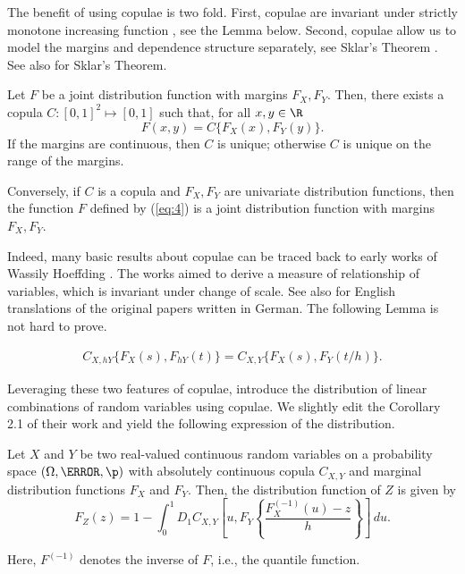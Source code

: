 The benefit of using copulae is two fold.
First, copulae are invariant under strictly
monotone increasing function \citep{schweizer1981nonparametric}, see the Lemma below.
Second, copulae allow us to model the  margins and dependence structure separately, see Sklar's Theorem
\citep{Sklar1959}.
See also \citep{Nelsen1999, joe1997multivariate, McNeil2005} for Sklar's Theorem. \medskip

\begin{theorem}
  Let $F$ be a joint distribution function with margins $F_X,
  F_Y$. Then, there exists a copula $C:[0,1]^2 \mapsto [0,1]$ such
  that, for all $x,y\in \R$
  \begin{equation}
    \label{eq:4}
    F(x,y)=C\{F_X(x), F_Y(y)\}.
  \end{equation}
  If the margins are continuous, then $C$ is unique; otherwise $C$ is
  unique on the range of the margins.

  Conversely, if $C$ is a copula and $F_X, F_Y$ are univariate
  distribution functions, then the function $F$ defined by (\ref{eq:4})
  is a joint distribution function with margins $F_X, F_Y$.
\end{theorem}

Indeed, many basic results about copulae can be traced back to early
works of Wassily Hoeffding \citep{hoedffding1940, hoedffding1941}. 
The works aimed to derive a measure of relationship of variables,
which is invariant under change of scale. 
See also \citet{hoeffding2012collected} for English translations of
the original papers written in German. 
The following Lemma is not hard to prove. 

\begin{lemma}
  \begin{align}
  C_{X, hY}\{F_X(s),F_{hY}(t)\} = C_{X, Y}\{F_X(s),F_{Y}(t/h)\}.
    \end{align}
  \end{lemma}


Leveraging these two features of copulae, \citet{barbi2014copula}
introduce the distribution of linear combinations of random variables
using copulae. 
We slightly edit the Corollary 2.1 of their work and yield the
following expression of the distribution. 

\begin{proposition}
  \label{prop:dfrh}
  Let $X$ and $Y$ be two real-valued continuous random
  variables on a
  probability space $(\Omega, \F, \p)$ with
  absolutely continuous copula $C_{X, Y}$ and marginal distribution functions $F_{X}$
  and $F_{Y}$. Then, the distribution function of $Z$ is given by 
  \begin{equation}
    \label{eq:3}
    F_{Z}(z) = 1- \int^1_0 D_1 C_{X, Y}
    \left[ u, F_{Y} \left\{ \frac{F^{(-1)}_{X}(u)-z}{h} \right\}
    \right]\, d u.
  \end{equation}
\end{proposition}
Here, $F^{(-1)}$ denotes the inverse of $F$, i.e., the quantile
function. \medskip

